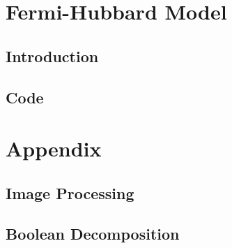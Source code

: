 \documentclass[twoside]{article}
\begin{document}
\section{Fermi-Hubbard Model}

\subsection{Introduction}


\subsection{Code}




\section{Appendix}

\subsection{Image Processing}


\subsection{Boolean Decomposition}




\end{document}
